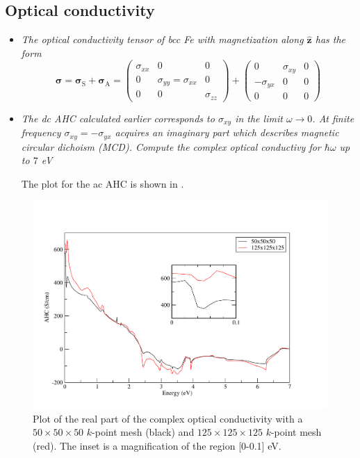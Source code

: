 \subsection*{Optical conductivity}
\begin{itemize}
	\item {\it The optical conductivity tensor of bcc Fe with magnetization along $\hat{\mathbf{z}}$ has the form }
\begin{equation}
\boldsymbol{\sigma} = \boldsymbol{\sigma}_\mathrm{S} + \boldsymbol{\sigma}_{\mathrm{A}} = 
\begin{pmatrix} 
\sigma_{xx} & 0                       & 0 \\ 
 0          & \sigma_{yy}=\sigma_{xx}  & 0 \\ 
 0          &  0                     & \sigma_{zz} 
\end{pmatrix} + \begin{pmatrix} 0 & \sigma_{xy} & 0 \\ -\sigma_{yx} & 0 & 0 \\ 0 & 0 & 0 \end{pmatrix} 
\end{equation}

	\item {\it
The dc AHC calculated earlier corresponds to $\sigma_{xy}$ in the limit $\omega \rightarrow 0$. At finite frequency $\sigma_{xy} = -\sigma_{yx}$ acquires
an imaginary part which describes magnetic circular dichoism (MCD).
Compute the complex optical conductivy for $\hbar\omega$ up to $7$ eV
}

The plot for the ac AHC is shown in .

\end{itemize} 
\begin{figure}[t!]
\centering
\includegraphics[width=0.7\columnwidth]{figure/example18/Fe-kubo_A_xy_125.pdf}
\caption{Plot of the real part of the complex optical conductivity with a $50\times50\times50$ $k$-point mesh (black) and $125\times125\times125$ $k$-point mesh (red). The inset is a magnification of the region [0-0.1] eV.}\label{fig18.4}
\end{figure}

